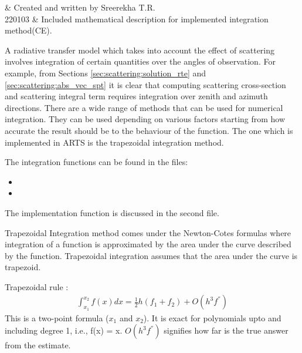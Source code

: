 \label{sec:integration}

 & Created and written by Sreerekha T.R.\\
  220103 & Included mathematical description for implemented integration method(CE).\\
\stophistory

%
%
A radiative transfer model which takes into account the effect of
scattering involves integration of certain quantities over the angles
of observation.  For example, from Sections
\ref{sec:scattering:solution_rte} and
\ref{sec:scattering:abs_vec_spt} it is clear that computing  
scattering cross-section  and scattering integral term requires
integration over zenith and azimuth directions. There are a wide range of
methods that can be used for numerical integration. They can be used
depending on various factors starting from how accurate the result
should be to the behaviour of the function. The one which is
implemented in ARTS is the trapezoidal integration method. 


\label{sec:integration:files}

The integration functions can be found in the files:
\begin{itemize}
\item {}
\item {}
\end{itemize}
The implementation function is
discussed in the second file. 

\label{sec:integration:trapezoidal}

Trapezoidal Integration method comes under the Newton-Cotes formulas
where integration of a function is approximated by the area under the
curve described by the function.  Trapezoidal integration assumes that
the area under the curve is trapezoid.  

Trapezoidal rule : 
\begin{eqnarray}
\label{eq:trapezoidal_rule}
{\int_{x_1}^{x_2} f(x)dx}  = \frac{1}{2} h (f_1 + f_2) + O(h^3 f^{''})
\end{eqnarray}
This is a two-point formula ($x_1$ and $x_2$).  It is exact for
polynomials upto and including degree 1, i.e., f(x) = x. $O(h^3
f^{''})$ signifies how far is the true answer from the estimate. 

